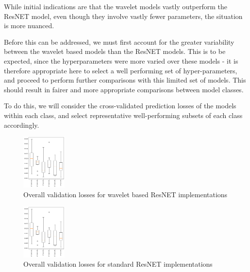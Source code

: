 \documentclass[9pt,conference]{IEEEtran}
\begin{document}
While initial indications are that the wavelet models vastly outperform the ResNET model, even though they involve vastly fewer parameters, the situation is more nuanced.

Before this can be addressed, we must first account for the greater variability between the wavelet based models than the ResNET models. This is to be expected, since the hyperparameters were more varied over these models - it is therefore appropriate here to select a well performing set of hyper-parameters, and proceed to perform further comparisons with this limited set of models. This should result in fairer and more appropriate comparisons between model classes.

To do this, we will consider the cross-validated prediction losses of the models within each class, and select representative well-performing subsets of each class accordingly.


\begin{figure}[H]
    \centering
    \includegraphics[width=0.2\textwidth]{waveletStlyeParams.png}
    \caption{Overall validation losses for wavelet based ResNET implementations}
\end{figure}

\begin{figure}
    \centering
    \includegraphics[width=0.2\textwidth]{waveletStlyeParams.png}
    \caption{Overall validation losses for standard ResNET implementations}
\end{figure}
\end{document}
